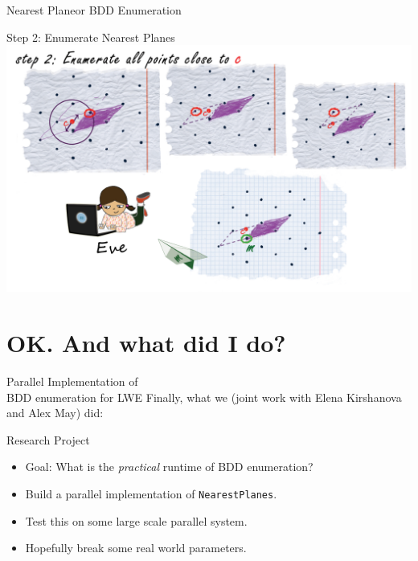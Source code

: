 \begin{frame}{Nearest Plane}{or BDD Enumeration}
{\begin{block}{Step 2: Enumerate Nearest Planes}
        \centering
        \includegraphics[keepaspectratio,width=\textwidth,height=0.8\textheight]{data/attack_step2}
    \end{block}
    }
\end{frame}

\section{OK\@. And what did I do?}
\begin{frame}{Parallel Implementation of\\BDD enumeration for LWE}
    \centering
    Finally, what we (joint work with Elena Kirshanova and Alex May) did:
    \begin{block}{Research Project}
        \begin{itemize}
            \item Goal: What is the \emph{practical} runtime of BDD enumeration?
            \item Build a parallel implementation of \texttt{NearestPlanes}.
            \item Test this on some large scale parallel system.
            \item Hopefully break some real world parameters.
        \end{itemize}
    \end{block}
\end{frame}

